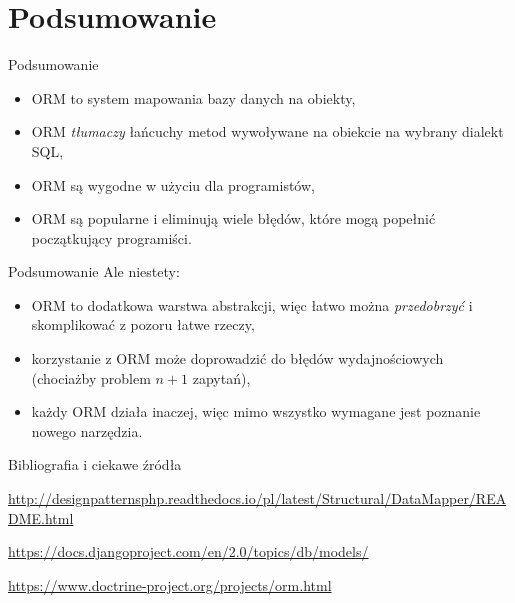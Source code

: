 \section{Podsumowanie}

\begin{frame}[fragile]{Podsumowanie}
	\begin{itemize}
		\item ORM to system mapowania bazy danych na obiekty,
		\item ORM \emph{tłumaczy} łańcuchy metod wywoływane na obiekcie na wybrany dialekt SQL,
		\item ORM są wygodne w użyciu dla programistów,
		\item ORM są popularne i eliminują wiele błędów, które mogą popełnić początkujący programiści.
	\end{itemize}
\end{frame}

\begin{frame}[fragile]{Podsumowanie}
	Ale niestety:
	
	\begin{itemize}
		\item ORM to dodatkowa warstwa abstrakcji, więc łatwo można \emph{przedobrzyć} i skomplikować z pozoru łatwe rzeczy,
		\item korzystanie z ORM może doprowadzić do błędów wydajnościowych (chociażby problem $n+1$ zapytań),
		\item każdy ORM działa inaczej, więc mimo wszystko wymagane jest poznanie nowego narzędzia.
	\end{itemize}
\end{frame}

\begin{frame}{Bibliografia i ciekawe źródła}
  
	\begin{thebibliography}{9}
		
		\url{http://designpatternsphp.readthedocs.io/pl/latest/Structural/DataMapper/README.html}
		
		\url{https://docs.djangoproject.com/en/2.0/topics/db/models/}
		
		\url{https://www.doctrine-project.org/projects/orm.html}
		
	\end{thebibliography}

\end{frame}

